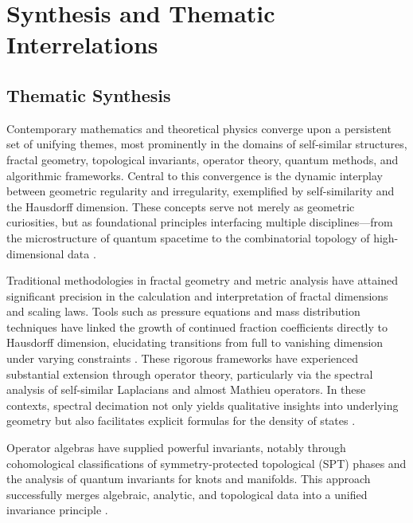 \documentclass[sigconf]{acmart}
\begin{document}
\section{Synthesis and Thematic Interrelations}

\subsection{Thematic Synthesis}

Contemporary mathematics and theoretical physics converge upon a persistent set of unifying themes, most prominently in the domains of self-similar structures, fractal geometry, topological invariants, operator theory, quantum methods, and algorithmic frameworks. Central to this convergence is the dynamic interplay between geometric regularity and irregularity, exemplified by self-similarity and the Hausdorff dimension. These concepts serve not merely as geometric curiosities, but as foundational principles interfacing multiple disciplines—from the microstructure of quantum spacetime to the combinatorial topology of high-dimensional data \cite{ref5,ref7,ref8,ref10,ref11,ref19,ref20,ref22,ref24,ref25,ref26,ref30,ref35,ref36,ref37,ref38,ref39,ref40,ref51,ref54,ref55,ref56,ref57,ref58,ref59,ref60,ref61,ref62,ref63,ref64,ref65}.

Traditional methodologies in fractal geometry and metric analysis have attained significant precision in the calculation and interpretation of fractal dimensions and scaling laws. Tools such as pressure equations and mass distribution techniques have linked the growth of continued fraction coefficients directly to Hausdorff dimension, elucidating transitions from full to vanishing dimension under varying constraints \cite{ref24}. These rigorous frameworks have experienced substantial extension through operator theory, particularly via the spectral analysis of self-similar Laplacians and almost Mathieu operators. In these contexts, spectral decimation not only yields qualitative insights into underlying geometry but also facilitates explicit formulas for the density of states \cite{ref25}. 

Operator algebras have supplied powerful invariants, notably through cohomological classifications of symmetry-protected topological (SPT) phases and the analysis of quantum invariants for knots and manifolds. This approach successfully merges algebraic, analytic, and topological data into a unified invariance principle \cite{ref26,ref56}.
\end{document}

